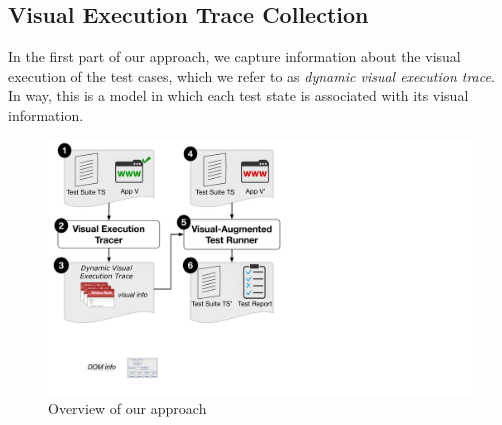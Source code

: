 \subsection{Visual Execution Trace Collection}
%
In the first part of our approach, we capture information about the visual execution of the test cases, which we refer to as \textit{dynamic visual execution trace}. In way, this is a model in which each test state is associated with its visual information.

\begin{figure}[t]
\centering
\includegraphics[trim={0.2cm 6.5cm 17cm 0.2cm},clip,scale=0.28]{images/approach-bigger}
\caption{Overview of our approach}
\label{approach}
\end{figure}




